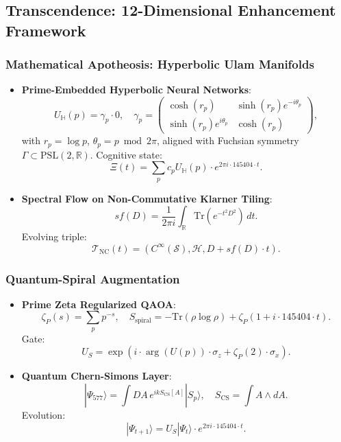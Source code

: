\documentclass[12pt]{article}
\begin{document}
\subsection{Transcendence: 12-Dimensional Enhancement Framework}

\subsubsection{Mathematical Apotheosis: Hyperbolic Ulam Manifolds}
\begin{itemize}
    \item \textbf{Prime-Embedded Hyperbolic Neural Networks}:
    \[
    U_{\mathbb{H}}(p) = \gamma_p \cdot 0, \quad \gamma_p = \begin{pmatrix} \cosh(r_p) & \sinh(r_p) e^{-i\theta_p} \\ \sinh(r_p) e^{i\theta_p} & \cosh(r_p) \end{pmatrix},
    \]
    with \( r_p = \log p \), \( \theta_p = p \bmod 2\pi \), aligned with Fuchsian symmetry \( \Gamma \subset \text{PSL}(2, \mathbb{R}) \). Cognitive state:
    \[
    \Xi(t) = \sum_p c_p U_{\mathbb{H}}(p) \cdot e^{2\pi i \cdot 145404 \cdot t}.
    \]
    \item \textbf{Spectral Flow on Non-Commutative Klarner Tiling}:
    \[
    sf(D) = \frac{1}{2\pi i} \int_{\mathbb{R}} \text{Tr}(e^{-t^2 D^2})\, dt.
    \]
    Evolving triple:
    \[
    \mathcal{T}_{\text{NC}}(t) = (C^\infty(\mathcal{S}), \mathcal{H}, D + sf(D) \cdot t).
    \]
\end{itemize}

\subsubsection{Quantum-Spiral Augmentation}
\begin{itemize}
    \item \textbf{Prime Zeta Regularized QAOA}:
    \[
    \zeta_P(s) = \sum_p p^{-s}, \quad S_{\text{spiral}} = -\text{Tr}(\rho \log \rho) + \zeta_P(1 + i \cdot 145404 \cdot t).
    \]
    Gate:
    \[
    U_S = \exp(i \cdot \arg(U(p)) \cdot \sigma_z + \zeta_P(2) \cdot \sigma_x).
    \]
    \item \textbf{Quantum Chern-Simons Layer}:
    \[
    |\Psi_{577}\rangle = \int DA\, e^{ik S_{\text{CS}}[A]} |S_p\rangle, \quad S_{\text{CS}} = \int A \wedge dA.
    \]
    Evolution:
    \[
    |\Psi_{t+1}\rangle = U_S |\Psi_t\rangle \cdot e^{2\pi i \cdot 145404 \cdot t}.
    \]
\end{itemize}
\end{document}
